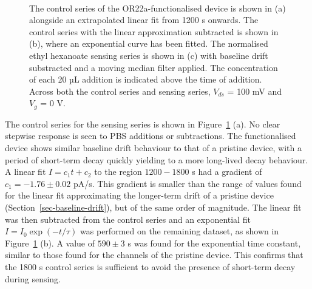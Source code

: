 \documentclass[
  a4paper,
]{scrbook}
\begin{document}
\begin{figure}
\begin{minipage}[t]{0.70\linewidth}
{{}

}

\end{minipage}%
%
\begin{minipage}[t]{0.15\linewidth}

{\centering 

~

}

\end{minipage}%

\caption{\label{fig-OR22a-series}The control series of the
OR22a-functionalised device is shown in (a) alongside an extrapolated
linear fit from 1200 s onwards. The control series with the linear
approximation subtracted is shown in (b), where an exponential curve has
been fitted. The normalised ethyl hexanoate sensing series is shown in
(c) with baseline drift substracted and a moving median filter applied.
The concentration of each 20 µL addition is indicated above the time of
addition. Across both the control series and sensing series, \(V_{ds}\)
= 100 mV and \(V_g\) = 0 V.}

\end{figure}

The control series for the sensing series is shown in
Figure~\ref{fig-OR22a-series} (a). No clear stepwise response is seen to
PBS additions or subtractions. The functionalised device shows similar
baseline drift behaviour to that of a pristine device, with a period of
short-term decay quickly yielding to a more long-lived decay behaviour.
A linear fit \(I = c_1t + c_2\) to the region \(1200-1800\) s had a
gradient of \(c_1 = -1.76\pm0.02\) pA/s. This gradient is smaller than
the range of values found for the linear fit approximating the
longer-term drift of a pristine device
(Section~\ref{sec-baseline-drift}), but of the same order of magnitude.
The linear fit was then subtracted from the control series and an
exponential fit \(I = I_0\exp(-t/\tau)\) was performed on the remaining
dataset, as shown in Figure~\ref{fig-OR22a-series} (b). A value of
\(590 \pm 3\) s was found for the exponential time constant, similar to
those found for the channels of the pristine device. This confirms that
the 1800 s control series is sufficient to avoid the presence of
short-term decay during sensing.
\end{document}
